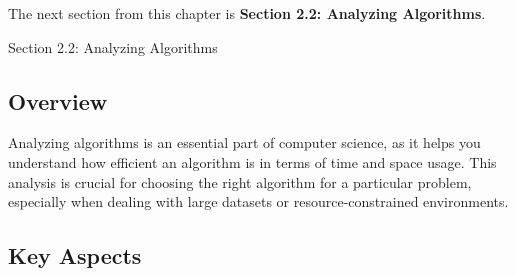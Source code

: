The next section from this chapter is \textbf{Section 2.2: Analyzing Algorithms}.

\begin{notes}{Section 2.2: Analyzing Algorithms}
    \subsection*{Overview}

    Analyzing algorithms is an essential part of computer science, as it helps you understand how efficient an algorithm is in terms of time and space usage. This analysis is crucial for choosing the 
    right algorithm for a particular problem, especially when dealing with large datasets or resource-constrained environments.

    \subsection*{Key Aspects}


\end{notes}
